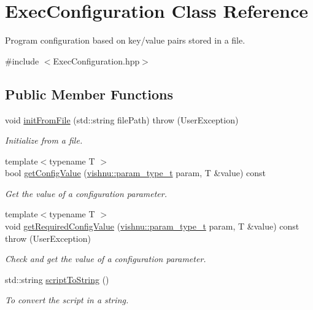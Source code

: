 \hypertarget{classExecConfiguration}{
\section{ExecConfiguration Class Reference}
\label{classExecConfiguration}
}


Program configuration based on key/value pairs stored in a file.  




{\ttfamily \#include $<$ExecConfiguration.hpp$>$}

\subsection*{Public Member Functions}
\begin{DoxyCompactItemize}
\item 
void \hyperlink{classExecConfiguration_acc0689c976ae6c48f88b3156bea802c1}{initFromFile} (std::string filePath)  throw (UserException)
\begin{DoxyCompactList}\small\item\em Initialize from a file. \item\end{DoxyCompactList}\item 
{\footnotesize template$<$typename T $>$ }\\bool \hyperlink{classExecConfiguration_a6642ffe0f41262c3b0188723c2c7ee14}{getConfigValue} (\hyperlink{namespacevishnu_afa06c1bb0b3442d83acb7650e8df75d1}{vishnu::param\_\-type\_\-t} param, T \&value) const 
\begin{DoxyCompactList}\small\item\em Get the value of a configuration parameter. \item\end{DoxyCompactList}\item 
{\footnotesize template$<$typename T $>$ }\\void \hyperlink{classExecConfiguration_abbfae5b4cf60595866016107c66e02ee}{getRequiredConfigValue} (\hyperlink{namespacevishnu_afa06c1bb0b3442d83acb7650e8df75d1}{vishnu::param\_\-type\_\-t} param, T \&value) const   throw (UserException)
\begin{DoxyCompactList}\small\item\em Check and get the value of a configuration parameter. \item\end{DoxyCompactList}\item 
\hypertarget{classExecConfiguration_a051728d6c1118fa523ac71e6b64abecc}{
std::string \hyperlink{classExecConfiguration_a051728d6c1118fa523ac71e6b64abecc}{scriptToString} ()}
\label{classExecConfiguration_a051728d6c1118fa523ac71e6b64abecc}

\begin{DoxyCompactList}\small\item\em To convert the script in a string. \item\end{DoxyCompactList}\end{DoxyCompactItemize}
